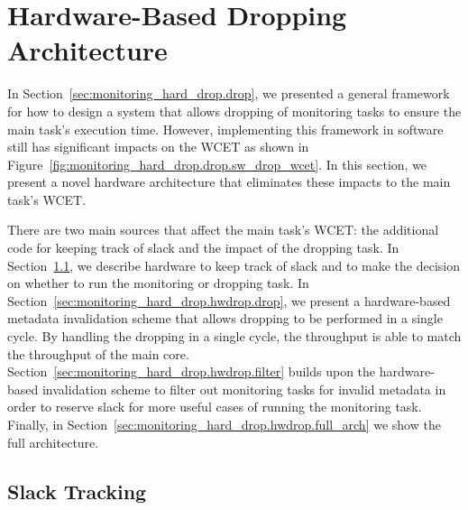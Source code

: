 \section{Hardware-Based Dropping Architecture}
\label{sec:monitoring_hard_drop.hwdrop}

In Section~\ref{sec:monitoring_hard_drop.drop}, we presented a general
framework for how to design a system that allows dropping of monitoring tasks
to ensure the main task's execution time. However, implementing this framework
in software still has significant impacts on the WCET as shown in
Figure~\ref{fig:monitoring_hard_drop.drop.sw_drop_wcet}.  In this section, we
present a novel hardware architecture that eliminates these impacts to the main
task's WCET.

There are two main sources that affect the main task's WCET: the additional
code for keeping track of slack and the impact of the dropping task.  In
Section~\ref{sec:monitoring_hard_drop.hwdrop.slack}, we describe hardware to
keep track of slack and to make the decision on whether to run the monitoring
or dropping task.  In Section~\ref{sec:monitoring_hard_drop.hwdrop.drop}, we
present a hardware-based metadata invalidation scheme that allows dropping to
be performed in a single cycle.  By handling the dropping in a single cycle,
the throughput is able to match the throughput of the main core.
Section~\ref{sec:monitoring_hard_drop.hwdrop.filter} builds upon the
hardware-based invalidation scheme to filter out monitoring tasks for invalid
metadata in order to reserve slack for more useful cases of running the
monitoring task. Finally, in
Section~\ref{sec:monitoring_hard_drop.hwdrop.full_arch} we show the full
architecture.

\subsection{Slack Tracking}
\label{sec:monitoring_hard_drop.hwdrop.slack}

